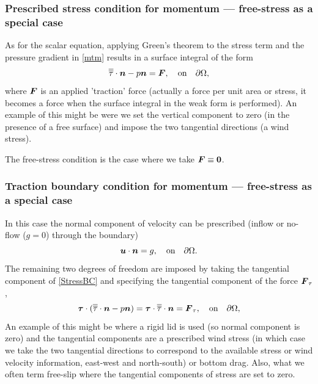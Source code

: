 \subsubsection{Prescribed stress condition for momentum --- free-stress as a special case}\label{sect:bc_scalar_stress}
As for the scalar equation, applying Green's theorem to the stress term and the pressure
gradient in \eqref{mtm} results in a surface integral of the form
\begin{equation}\label{StressBC}
\overline{\overline{\tau}}\cdot{\mbox{\boldmath$n$}} - p{\mbox{\boldmath$n$}} = {\mbox{\boldmath$F$}},\quad \textrm{on}\quad \partial\Omega,
\end{equation}
where ${\mbox{\boldmath$F$}}$ is an applied 'traction' force (actually a force per unit area or stress, it becomes
a force when the surface integral in the weak form is performed). An example of this might be were we set the vertical
component to zero (in the presence of a free surface) and impose the two tangential directions
(\eg a wind stress).

The free-stress condition
is the case where we take ${\mbox{\boldmath$F$}}\equiv{\mbox{\boldmath$0$}}$.


\subsubsection{Traction boundary condition for momentum --- free-stress as a special case}\label{sect:bc_scalar_traction}
In this case the normal component of velocity can be prescribed (\eg inflow or
no-flow ($g=0$) through the boundary)
\begin{equation*}
{\mbox{\boldmath$u$}}\cdot{\mbox{\boldmath$n$}} = g,\quad \textrm{on}\quad \partial\Omega.
\end{equation*}
The remaining two degrees of freedom are imposed by taking the
tangential component of \eqref{StressBC} and specifying the tangential component
of the force ${\mbox{\boldmath$F$}}_{\tau}$, \ie
\begin{equation*}
{\mbox{\boldmath$\tau$}}\cdot(\overline{\overline{\tau}}\cdot{\mbox{\boldmath$n$}} - p{\mbox{\boldmath$n$}}) = {\mbox{\boldmath$\tau$}}\cdot\overline{\overline{\tau}}\cdot{\mbox{\boldmath$n$}} = {\mbox{\boldmath$F$}}_{\tau},\quad \textrm{on}\quad \partial\Omega,
\end{equation*}
An example of this might be where a rigid lid is used (so normal component is zero)
and the tangential components are a prescribed wind stress (in which case we take
the two tangential directions to correspond to the available stress or wind velocity
information, \ie east-west and north-south) or bottom drag. Also, what we often term free-slip
where the tangential components of stress are set to zero.

